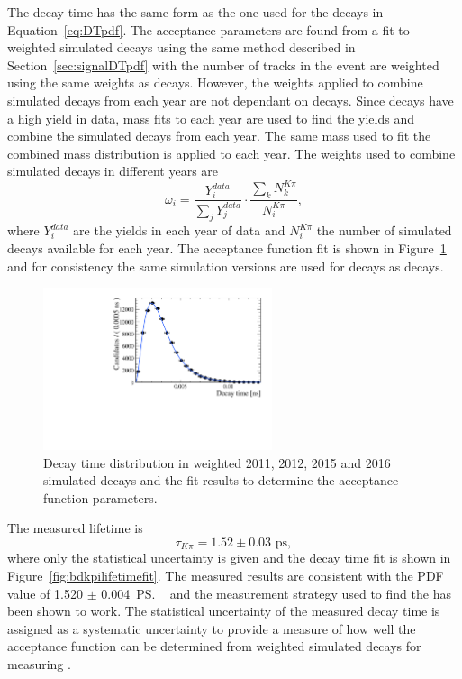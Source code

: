 The decay time \pdf has the same form as the one used for the \bsmumu decays in Equation~\ref{eq:DTpdf}. The acceptance parameters are found from a fit to weighted \bdkpi simulated decays using the same method described in Section~\ref{sec:signalDTpdf} with the number of tracks in the event are weighted using the same weights as \bsmumu decays. However, the weights applied to combine simulated \bdkpi decays from each year are not dependant on \bsjpsiphi decays. Since \bdkpi decays have a high yield in data, mass fits to each year are used to find the yields and combine the simulated decays from each year. The same mass \pdf used to fit the combined mass distribution is applied to each year. The weights used to combine simulated decays in different years are
\begin{equation}
\omega_{i}  = \frac{Y_{i}^{data}}{\displaystyle\sum_{j} Y_{j}^{data}} \cdot \frac{\displaystyle\sum_{k} N_{k}^{K\pi}}{N_{i}^{K\pi}},
\end{equation}
where $Y_{i}^{data}$ are the \bdkpi yields in each year of data and $N_{i}^{K\pi}$ the number of simulated decays available for each year.
The acceptance function fit is shown in Figure~\ref{fig:bdkpiacceptancefit} and for consistency the same simulation versions are used for \bdkpi decays as \bsmumu decays. 

\begin{figure}[htbp]
\centering
  \includegraphics[width=0.6\textwidth]{./Figs/LifetimeSystematics/Bd2KPi_acceptance_fit.pdf}
\caption{Decay time distribution in weighted 2011, 2012, 2015 and 2016 simulated decays and the \ml fit results to determine the acceptance function parameters. }
\label{fig:bdkpiacceptancefit}
\end{figure}

The measured \bdkpi lifetime is
\begin{equation}
\tau_{K\pi} = 1.52 \pm 0.03  \text{ ps},
\end{equation}
where only the statistical uncertainty is given and the decay time fit is shown in Figure~\ref{fig:bdkpilifetimefit}. The measured results are consistent with the PDF value of 1.520 $\pm$ 0.004~\ps~\cite{Olive:2016xmw} and the measurement strategy used to find the \bsmumu \el has been shown to work. The statistical uncertainty of the measured \bdkpi decay time is assigned as a systematic uncertainty to provide a measure of how well the acceptance function can be determined from weighted simulated decays for measuring \tmumu. 

